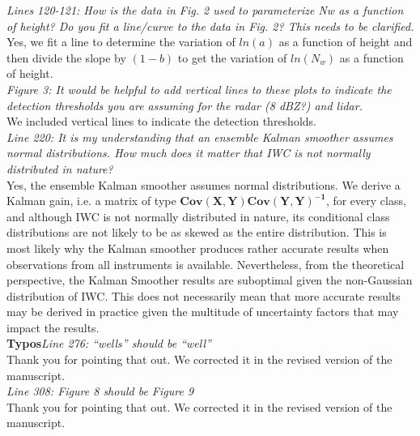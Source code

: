 \documentclass[12pt]{article}
\begin{document}
\newline
\textit{Lines 120-121: How is the data in Fig. 2 used to parameterize Nw as a function of height? Do you fit a line/curve to the 
data in Fig. 2? This needs to be clarified.}\\
\newline
Yes, we fit a line to determine the variation of $ln(a)$ as a function of height and then divide the slope by $(1-b)$ to get the variation of
$ln(N_w)$ as a function of height.\\
\newline
\textit{Figure 3: It would be helpful to add vertical lines to these plots to indicate the detection thresholds you are 
assuming for the radar (8 dBZ?) and lidar.}\\
\newline
We included vertical lines to indicate the detection thresholds.\\
\newline
\textit{Line 220: It is my understanding that an ensemble Kalman smoother assumes normal distributions. How much does it matter 
that IWC is not normally distributed in nature?}\\
\newline
Yes, the ensemble Kalman smoother assumes normal distributions.  We derive a Kalman gain, i.e. a matrix of type $\mathbf{Cov(X,Y) Cov(Y,Y)^{-1}}$, 
for every class, and although IWC is not normally distributed in nature, its conditional class distributions are not likely to be as skewed 
as the entire distribution.
This is most likely why the Kalman smoother produces rather accurate results when observations from all instruments is available.  
Nevertheless, from the theoretical perspective, the Kalman Smoother results are suboptimal given the non-Gaussian distribution of IWC.  This
does not necessarily mean that more accurate results may be derived in practice given the multitude of uncertainty factors that may
impact the results.\\
\newline
\textbf{Typos}\textit{Line 276: “wells” should be “well”}\\
\newline
Thank you for pointing that out. We corrected it in the revised version of the manuscript.\\
\newline
\textit{Line 308: Figure 8 should be Figure 9}\\
\newline
Thank you for pointing that out. We corrected it in the revised version of the manuscript.\\
\end{document}

